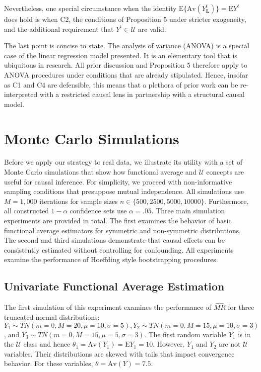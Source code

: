 \documentclass[12pt]{amsart}
\theoremstyle{plain}%
\theoremstyle{definition}
\theoremstyle{remark}
\numberwithin{equation}{section}
\begin{document}
Nevertheless, one special circumstance when the identity $\text{E} \{ \text{Av}(Y_{\mathbf{L}}^t) \} = \text{E}Y^t$ does hold is when C2, the conditions of Proposition 5 under stricter exogeneity, and the additional requirement that $Y^t \in \mathcal{U}$ are valid.

The last point is concise to state. The analysis of variance (ANOVA) is a special case of the linear regression model presented. It is an elementary tool that is ubiquitous in research. All prior discussion and Proposition 5 therefore apply to ANOVA procedures under conditions that are already stipulated. Hence, insofar as C1 and C4 are defensible, this means that a plethora of prior work can be re-interpreted with a restricted causal lens in partnership with a structural causal model.
\section{Monte Carlo Simulations}
Before we apply our strategy to real data, we illustrate its utility with a set of Monte Carlo simulations that show how functional average and $\mathcal{U}$ concepts are useful for causal inference. For simplicity, we proceed with non-informative sampling conditions that presuppose mutual independence. All simulations use $M=1,000$ iterations for sample sizes $n \in \{500, 2500, 5000, 10000 \}$. Furthermore, all constructed $1-\alpha$ confidence sets use $\alpha = .05$. Three main simulation experiments are provided in total. The first examines the behavior of basic functional average estimators for symmetric and non-symmetric distributions. The second and third simulations demonstrate that causal effects can be consistently estimated without controlling for confounding. All experiments examine the performance of Hoeffding style bootstrapping procedures.
\subsection{Univariate Functional Average Estimation}
The first simulation of this experiment examines the performance of $\hat{MR}$ for three truncated normal distributions: $Y_1 \sim TN(m=0, M=20, \mu = 10, \sigma = 5), Y_2 \sim TN(m=0, M=15, \mu = 10, \sigma = 3)$, and $Y_3 \sim TN(m=0, M=15, \mu = 5, \sigma = 3)$. The first random variable $Y_1$ is in the $\mathcal{U}$ class and hence $\theta_1 = \text{Av}(Y_1) = \text{E}Y_1 = 10$. However, $Y_1$ and $Y_2$ are not $\mathcal{U}$ variables. Their distributions are skewed with tails that impact convergence behavior. For these variables, $\theta = \text{Av}(Y) = 7.5$.
\end{document}
